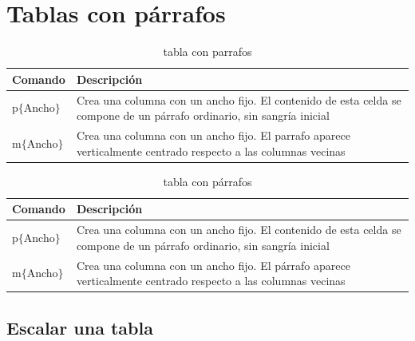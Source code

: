 \documentclass[12pt]{article}
\begin{document}
\section{Tablas con párrafos}

\begin{table}[H]
\centering
\begin{tabular}{|l|p{6cm}|}
\hline
Comando & Descripción \\
\hline
p$\{$Ancho$\}$ & Crea una columna con un ancho fijo. El contenido de esta celda se compone de un párrafo ordinario, sin sangría inicial\\
\hline
m$\{$Ancho$\}$ & Crea una columna con un ancho fijo. El parrafo aparece verticalmente centrado respecto a las columnas vecinas\\
\hline
\end{tabular}
\caption{tabla con parrafos}
\label{lineas}
\end{table}

\begin{table}[H]
\centering
\begin{tabular}{|l|m{6cm}|}
\hline
Comando & Descripción \\
\hline
p$\{$Ancho$\}$ & Crea una columna con un ancho fijo. El contenido de esta celda se compone de un párrafo ordinario, sin sangría inicial\\
\hline
m$\{$Ancho$\}$ & Crea una columna con un ancho fijo. El párrafo aparece verticalmente centrado respecto a las columnas vecinas\\
\hline
\end{tabular}
\caption{tabla con párrafos}
\label{lineas}
\end{table}

\subsection{Escalar una tabla}

\begin{table}[H]
\centering
{}
\caption{tabla escalada}
\label{lineas}
\end{table}
\end{document}
